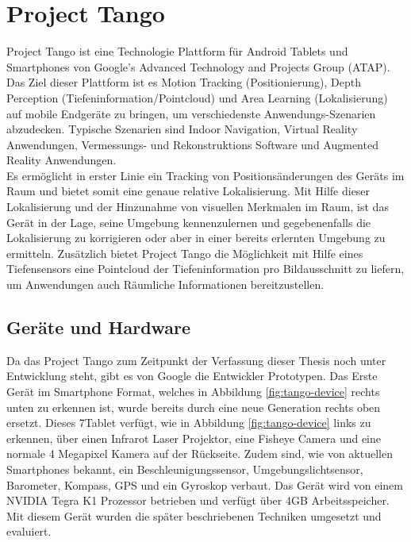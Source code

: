 
\section{Project Tango} \label{sec:theory_project_tango}

Project Tango ist eine Technologie Plattform für Android Tablets und Smartphones von Google’s Advanced Technology and Projects Group (ATAP). Das Ziel dieser Plattform ist es Motion Tracking (Positionierung), Depth Perception (Tiefeninformation/Pointcloud) und Area Learning (Lokalisierung) auf mobile Endgeräte zu bringen, um verschiedenste Anwendungs-Szenarien abzudecken. Typische Szenarien sind Indoor Navigation, Virtual Reality Anwendungen, Vermessungs- und Rekonstruktions Software und Augmented Reality Anwendungen.\\

Es ermöglicht in erster Linie ein Tracking von Positionsänderungen des Geräts im Raum und bietet somit eine genaue relative Lokalisierung. Mit Hilfe dieser Lokalisierung und der Hinzunahme von visuellen Merkmalen im Raum, ist das Gerät in der Lage, seine Umgebung kennenzulernen und gegebenenfalls die Lokalisierung zu korrigieren oder aber in einer bereits erlernten Umgebung zu ermitteln. Zusätzlich bietet Project Tango die Möglichkeit mit Hilfe eines Tiefensensors eine Pointcloud der Tiefeninformation pro Bildausschnitt zu liefern, um Anwendungen auch Räumliche Informationen bereitzustellen.  \citep{Proje19:online} \\

\subsection{Geräte und Hardware}

Da das Project Tango zum Zeitpunkt der Verfassung dieser Thesis noch unter Entwicklung steht, gibt es von Google die Entwickler Prototypen. Das Erste Gerät im Smartphone Format, welches in Abbildung \ref{fig:tango-device} rechts unten zu erkennen ist, wurde bereits durch eine neue Generation rechts oben ersetzt. Dieses 7\dq Tablet verfügt, wie in Abbildung \ref{fig:tango-device} links zu erkennen, über einen Infrarot Laser Projektor, eine Fisheye Camera und eine normale 4 Megapixel Kamera auf der Rückseite. Zudem sind, wie von aktuellen Smartphones bekannt, ein Beschleunigungssensor, Umgebungslichtsensor, Barometer, Kompass, GPS und ein Gyroskop verbaut. Das Gerät wird von einem NVIDIA Tegra K1 Prozessor betrieben und verfügt über 4GB Arbeitsspeicher. \citep{Proje19:online} Mit diesem Gerät wurden die später beschriebenen Techniken umgesetzt und evaluiert.  \\

